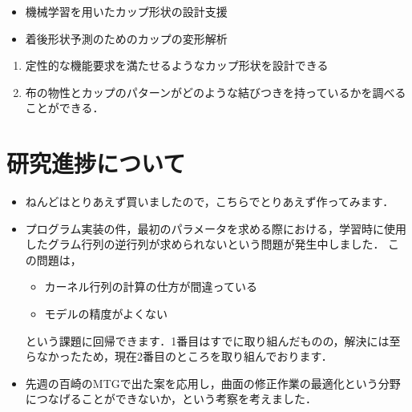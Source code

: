 \documentclass[11pt]{jsarticle}
\begin{document}
	\articleSPRabst
		\begin{itemize}
			\item 機械学習を用いたカップ形状の設計支援
			\item 着後形状予測のためのカップの変形解析
		\end{itemize}
		
		
	\articleSPRobj
		\begin{enumerate}
			\item 定性的な機能要求を満たせるようなカップ形状を設計できる
			\item 布の物性とカップのパターンがどのような結びつきを持っているかを調べることができる．
		\end{enumerate}
	\articleSPRitemsone
		
		\tableofcontents
		
		
	\articleSPRitemstwo
	\renewcommand{\labelitemi}{$\blacktriangledown$}
	\newcommand{\argmax}{\mathop{\rm arg~max}\limits}
	\newcommand{\argmin}{\mathop{\rm arg~min}\limits}
	\section{研究進捗について}
		\begin{itemize}
			\item ねんどはとりあえず買いましたので，こちらでとりあえず作ってみます．
			\item プログラム実装の件，最初のパラメータを求める際における，学習時に使用したグラム行列の逆行列が求められないという問題が発生中しました．
			この問題は，
			\begin{itemize}
				\item カーネル行列の計算の仕方が間違っている
				\item モデルの精度がよくない
			\end{itemize}
		
			という課題に回帰できます．1番目はすでに取り組んだものの，解決には至らなかったため，現在2番目のところを取り組んでおります．
			\item 先週の百崎のMTGで出た案を応用し，曲面の修正作業の最適化という分野につなげることができないか，という考察を考えました．
		\end{itemize}
\end{document}
